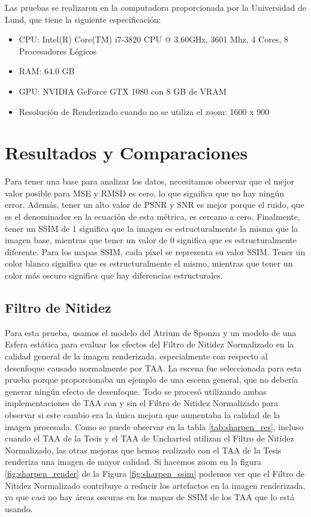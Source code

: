 \documentclass[pregrado]{tesis-usb} %
\begin{document}
Las pruebas se realizaron en la computadora proporcionada por la Universidad de Lund, que tiene la siguiente especificación:
\begin{itemize}
\setlength\itemsep{0em}
\item CPU: Intel(R) Core(TM) i7-3820 CPU @ 3.60GHz, 3601 Mhz, 4 Cores, 8 Procesadores Lógicos
\item RAM: 64.0 GB	
\item GPU: NVIDIA GeForce GTX 1080 con 8 GB de VRAM
\item Resolución de Renderizado cuando no se utiliza el zoom: 1600 x 900
\end{itemize}

\section{Resultados y Comparaciones}
Para tener una base para analizar los datos, necesitamos observar que el mejor valor posible para MSE y RMSD es cero, lo que significa que no hay ningún error. Además, tener un alto valor de PSNR y SNR es mejor porque el ruido, que es el denominador en la ecuación de esta métrica, es cercano a cero. Finalmente, tener un SSIM de $1$ significa que la imagen es estructuralmente la misma que la imagen base, mientras que tener un valor de $0$ significa que es estructuralmente diferente. Para los mapas SSIM, cada píxel se representa su valor SSIM. Tener un color blanco significa que es estructuralmente el mismo, mientras que tener un color más oscuro significa que hay diferencias estructurales.

\subsection{Filtro de Nitidez}
Para esta prueba, usamos el modelo del Atrium de Sponza y un modelo de una Esfera estática para evaluar los efectos del Filtro de Nitidez Normalizado en la calidad general de la imagen renderizada, especialmente con respecto al desenfoque causado normalmente por TAA. La escena fue seleccionada para esta prueba porque proporcionaba un ejemplo de una escena general, que no debería generar ningún efecto de desenfoque. Todo se procesó utilizando ambas implementaciones de TAA con y sin el Filtro de Nitidez Normalizado para observar si este cambio era la única mejora que aumentaba la calidad de la imagen procesada. Como se puede observar en la tabla \ref{tab:sharpen_res}, incluso cuando el TAA de la Tesis y el TAA de Uncharted utilizan el Filtro de Nitidez Normalizado, las otras mejoras que hemos realizado  con el TAA de la Tesis renderiza una imagen de mayor calidad. Si hacemos zoom en la figura \ref{fig:sharpen_render} de la Figura \ref{fig:sharpen_ssim} podemos ver que el Filtro de Nitidez Normalizado contribuye a reducir los artefactos en la imagen renderizada, ya que casi no hay áreas oscuras en los mapas de SSIM de los TAA que lo está usando.
\end{document}
